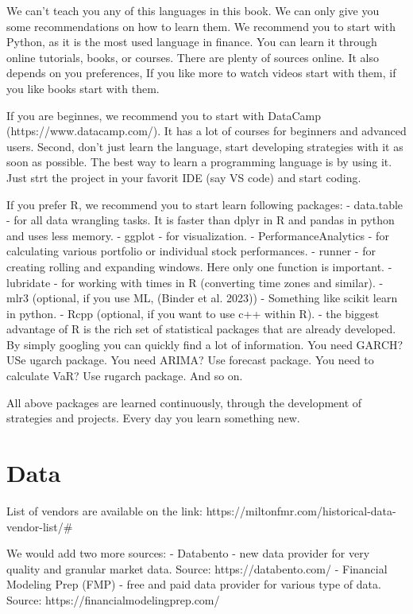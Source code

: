 \documentclass[
  letterpaper,
  DIV=11,
  numbers=noendperiod]{scrreprt}
\begin{document}
We can't teach you any of this languages in this book. We can only give
you some recommendations on how to learn them. We recommend you to start
with Python, as it is the most used language in finance. You can learn
it through online tutorials, books, or courses. There are plenty of
sources online. It also depends on you preferences, If you like more to
watch videos start with them, if you like books start with them.

If you are beginnes, we recommend you to start with DataCamp
(https://www.datacamp.com/). It has a lot of courses for beginners and
advanced users. Second, don't just learn the language, start developing
strategies with it as soon as possible. The best way to learn a
programming language is by using it. Just strt the project in your
favorit IDE (say VS code) and start coding.

If you prefer R, we recommend you to start learn following packages: -
data.table - for all data wrangling tasks. It is faster than dplyr in R
and pandas in python and uses less memory. - ggplot - for visualization.
- PerformanceAnalytics - for calculating various portfolio or individual
stock performances. - runner - for creating rolling and expanding
windows. Here only one function is important. - lubridate - for working
with times in R (converting time zones and similar). - mlr3 (optional,
if you use ML, (Binder et al. 2023)) - Something like scikit learn in
python. - Rcpp (optional, if you want to use c++ within R). - the
biggest advantage of R is the rich set of statistical packages that are
already developed. By simply googling you can quickly find a lot of
information. You need GARCH? USe ugarch package. You need ARIMA? Use
forecast package. You need to calculate VaR? Use rugarch package. And so
on.

All above packages are learned continuously, through the development of
strategies and projects. Every day you learn something new.

\section{Data}\label{data}

List of vendors are available on the link:
https://miltonfmr.com/historical-data-vendor-list/\#

We would add two more sources: - Databento - new data provider for very
quality and granular market data. Source: https://databento.com/ -
Financial Modeling Prep (FMP) - free and paid data provider for various
type of data. Source: https://financialmodelingprep.com/
\end{document}
